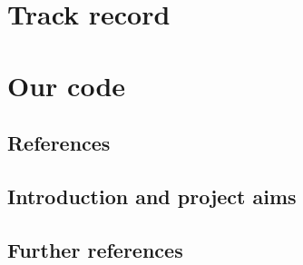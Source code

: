 \documentclass[
squeezespace=false,
showframe=false,
a4paper,
fontsize=11pt]{ukriproposal}
\begin{document}
\begin{refsegment}

\maketitle

\section*{Track record}

\section*{Our code}

\subsection*{References}
\printbibliography[heading=none,
resetnumbers=false,
segment=\therefsegment,
check=onlynew]
\end{refsegment}

\newpage

\maketitle

\begin{refsegment}


\section{Introduction and project aims}

\subsection*{Further references}
\printbibliography[heading=none,
resetnumbers=false,
segment=\therefsegment,
check=onlynew]
\end{refsegment}
\end{document}
